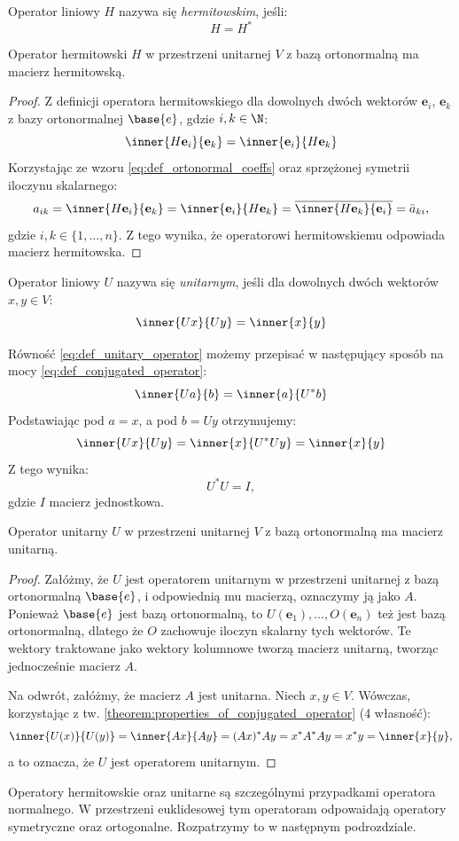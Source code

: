 \begin{definition}\label{def:h_operator}
Operator liniowy $H$ nazywa się \textit{hermitowskim}, jeśli:
$$H = H^*$$
\end{definition}
\begin{theorem}
    Operator hermitowski $H$ w przestrzeni unitarnej $V$ z bazą ortonormalną ma macierz hermitowską.
\end{theorem}
\begin{proof}
    Z definicji operatora hermitowskiego dla dowolnych dwóch wektorów $\textbf{e}_i$, $\textbf{e}_k$ z bazy ortonormalnej $\base{e}$, gdzie $i, k \in \N$:
    $$\inner{H\textbf{e}_i}{\textbf{e}_k} = \inner{\textbf{e}_i}{H\textbf{e}_k}$$
    Korzystając ze wzoru \eqref{eq:def_ortonormal_coeffs} oraz sprzężonej symetrii iloczynu skalarnego:
    $$ a_{ik} = \inner{H\textbf{e}_i}{\textbf{e}_k} = \inner{\textbf{e}_i}{H\textbf{e}_k} = \overline{\inner{H\textbf{e}_k}{\textbf{e}_i}} = \bar{a}_{ki}, $$ gdzie $i, k \in \{1, \dots, n\}$. Z tego wynika, że operatorowi hermitowskiemu odpowiada macierz hermitowska.
\end{proof}

\begin{definition}\label{def:unitary_operator}
    Operator liniowy $U$ nazywa się \textit{unitarnym}, jeśli dla dowolnych dwóch wektorów $x, y \in V$:
    \begin{equation}\label{eq:def_unitary_operator}
        \inner{Ux}{Uy} = \inner{x}{y}
    \end{equation}
\end{definition}
Równość \eqref{eq:def_unitary_operator} możemy przepisać w następujący sposób na mocy \eqref{eq:def_conjugated_operator}:
$$\inner{Ua}{b} = \inner{a}{U^*b}$$
Podstawiając pod $a = x$, a pod $b = Uy$ otrzymujemy:
$$\inner{Ux}{Uy} = \inner{x}{U^*Uy} = \inner{x}{y}$$
Z tego wynika:
\begin{equation}
    U^*U = I,
\end{equation} gdzie $I$ macierz jednostkowa. 

\begin{theorem}
    Operator unitarny $U$ w przestrzeni unitarnej $V$ z bazą ortonormalną ma macierz unitarną.
\end{theorem}
\begin{proof}
    Załóżmy, że $U$ jest operatorem unitarnym w przestrzeni unitarnej z bazą ortonormalną $\base{e}$, i odpowiednią mu macierzą, oznaczymy ją jako $A$.
    Ponieważ $\base{e}$ jest bazą ortonormalną, to $U(\mathbf{e}_1), \ldots, O(\mathbf{e}_n)$ też jest bazą ortonormalną, dlatego że $O$ zachowuje iloczyn skalarny tych wektorów. Te wektory traktowane jako wektory kolumnowe tworzą macierz unitarną, tworząc jednocześnie macierz $A$.

    Na odwrót, załóżmy, że macierz $A$ jest unitarna. Niech $x, y \in V$. Wówczas, korzystając z tw. \ref{theorem:properties_of_conjugated_operator} (4 własność):
    $$\inner{U(x)}{U(y)} = \inner{Ax}{Ay} = (Ax)^*Ay = x^*A^*Ay = x^*y = \inner{x}{y},$$
    a to oznacza, że $U$ jest operatorem unitarnym.
\end{proof}

Operatory hermitowskie oraz unitarne są szczególnymi przypadkami operatora normalnego.
W przestrzeni euklidesowej tym operatoram odpowaidają operatory symetryczne oraz ortogonalne. Rozpatrzymy to w następnym podrozdziale.

